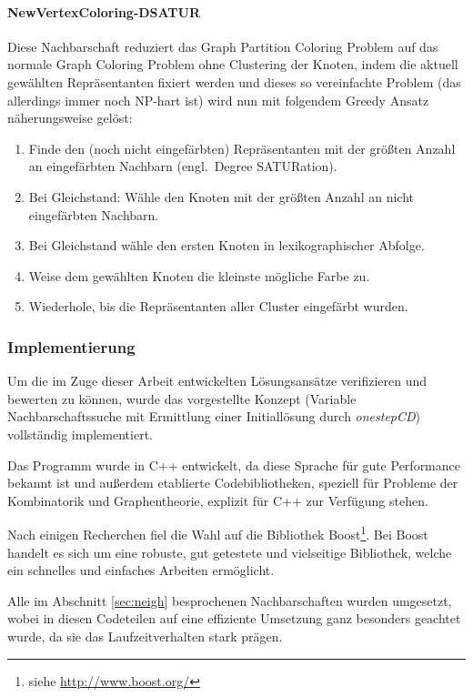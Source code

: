 \documentclass[paper=a4,fontsize=12pt]{scrartcl}
\begin{document}
\paragraph{NewVertexColoring-DSATUR}
Diese Nachbarschaft reduziert das Graph Partition Coloring Problem auf das normale Graph Coloring Problem ohne Clustering der Knoten, indem die aktuell gewählten Repräsentanten fixiert werden und dieses so vereinfachte Problem (das allerdings immer noch NP-hart ist) wird nun mit folgendem Greedy Ansatz näherungsweise gelöst:

\begin{enumerate}
    \item Finde den (noch nicht eingefärbten) Repräsentanten mit der größten Anzahl an eingefärbten Nachbarn (engl.\ Degree SATURation).
    \item Bei Gleichstand: Wähle den Knoten mit der größten Anzahl an nicht eingefärbten Nachbarn.
    \item Bei Gleichstand wähle den ersten Knoten in lexikographischer Abfolge.
    \item Weise dem gewählten Knoten die kleinste mögliche Farbe zu.
    \item Wiederhole, bis die Repräsentanten aller Cluster eingefärbt wurden.
\end{enumerate}

\subsubsection{Implementierung}
Um die im Zuge dieser Arbeit entwickelten Lösungsansätze verifizieren und bewerten zu können, wurde das vorgestellte Konzept (Variable Nachbarschaftssuche mit Ermittlung einer Initiallösung durch \emph{onestepCD}) vollständig implementiert.

Das Programm wurde in C++ entwickelt, da diese Sprache für gute Performance bekannt ist und außerdem etablierte Codebibliotheken, speziell für Probleme der Kombinatorik und Graphentheorie, explizit für C++ zur Verfügung stehen.

Nach einigen Recherchen fiel die Wahl auf die Bibliothek Boost\footnote{siehe \url{http://www.boost.org/}}. Bei Boost handelt es sich um eine robuste, gut getestete und vielseitige Bibliothek, welche ein schnelles und einfaches Arbeiten ermöglicht.

Alle im Abschnitt \ref{sec:neigh} besprochenen Nachbarschaften wurden umgesetzt, wobei in diesen Codeteilen auf eine effiziente Umsetzung ganz besonders geachtet wurde, da sie das Laufzeitverhalten stark prägen.
\end{document}
